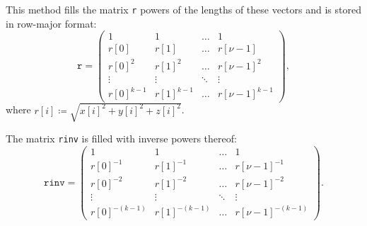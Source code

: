 \documentclass{scrbook}
\begin{document}
This method fills the matrix \lstinline|r| powers of the lengths of these
vectors and is stored in row-major format:
\begin{equation*}
\mathtt{r} = 
\begin{pmatrix}
1          & 1          & \hdots & 1          \\
r[0]       & r[1]       & \hdots & r[\nu-1]   \\
r[0]^2     & r[1]^2     & \hdots & r[\nu-1]^2 \\
\vdots     & \vdots     & \ddots & \vdots     \\
r[0]^{k-1} & r[1]^{k-1} & \hdots & r[\nu-1]^{k-1}
\end{pmatrix},
\end{equation*}
where $r[i] \coloneqq \sqrt{x[i]^2+y[i]^2+z[i]^2}$.

The matrix \lstinline|rinv| is filled with inverse powers thereof:
\begin{equation*}
\mathtt{rinv} = 
\begin{pmatrix}
1             & 1             & \hdots & 1               \\
r[0]^{-1}     & r[1]^{-1}     & \hdots & r[\nu-1]^{-1}   \\
r[0]^{-2}     & r[1]^{-2}     & \hdots & r[\nu-1]^{-2}   \\
\vdots        & \vdots        & \ddots & \vdots          \\
r[0]^{-(k-1)} & r[1]^{-(k-1)} & \hdots & r[\nu-1]^{-(k-1)}
\end{pmatrix}.
\end{equation*}
\end{document}
